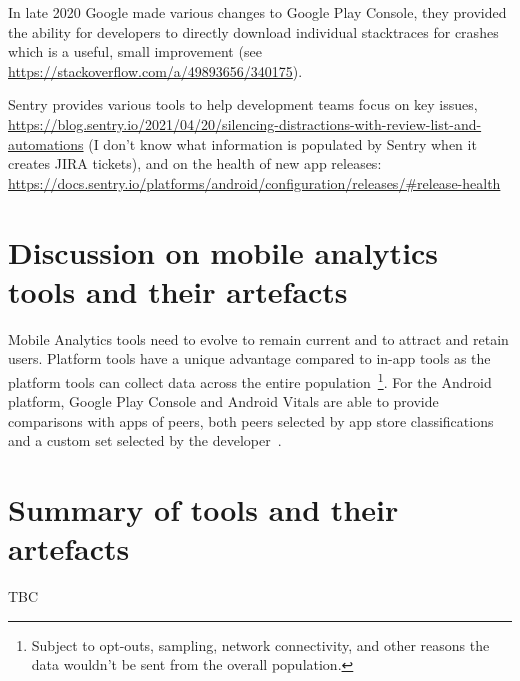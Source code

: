In late 2020 Google made various changes to Google Play Console, they provided the ability for developers to directly download individual stacktraces for crashes~\citep{stackoverflow2018_how_can_i_get_app_crash_log_from_google_play_console} which is a useful, small improvement (see \url{https://stackoverflow.com/a/49893656/340175}).


Sentry provides various tools to help development teams focus on key issues,  \url{https://blog.sentry.io/2021/04/20/silencing-distractions-with-review-list-and-automations} (I don't know what information is populated by Sentry when it creates JIRA tickets),  and on the health of new app releases: \url{https://docs.sentry.io/platforms/android/configuration/releases/#release-health}


\section{Discussion on mobile analytics tools and their artefacts}
Mobile Analytics tools need to evolve to remain current and to attract and retain users. Platform tools have a unique advantage compared to in-app tools as the platform tools can collect data across the entire population~\footnote{Subject to opt-outs, sampling, network connectivity, and other reasons the data wouldn't be sent from the overall population.}. For the Android platform, Google Play Console and Android Vitals are able to provide comparisons with apps of peers, both peers selected by app store classifications~\citep{androiddevelopersblog2021_gpc_powers_better_strategic_decisions_etc} and a custom set selected by the developer~\citep{play_console_help_compare_your_apps_android_vitals_and_ratings_with_peer_groups}. 

\section{Summary of tools and their artefacts}
TBC